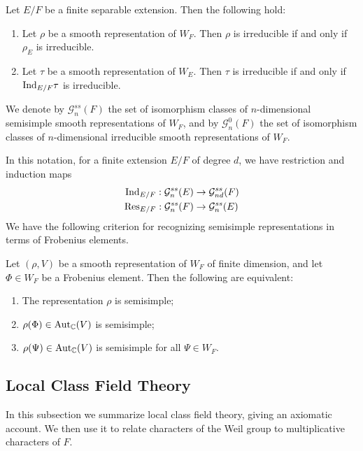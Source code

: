 \begin{lemma}
	Let $E/F$ be a finite separable extension. Then the following hold:
	\begin{enumerate}
		\item Let $\rho$ be a smooth representation of $W_F$. Then $\rho$ is irreducible if and only if $\rho_E$ is irreducible.
		\item Let $\tau$ be a smooth representation of $W_E$. Then $\tau$ is irreducible if and only if $\mathrm{Ind}_{E/F} \tau$ is irreducible.
	\end{enumerate}
\end{lemma}
\begin{notn}
	We denote by $\mathcal{G}^{ss}_n(F)$ the set of isomorphism classes of $n$-dimensional semisimple smooth representations of $W_F$, and by $\mathcal{G}^0_n(F)$ the set of isomorphism classes of $n$-dimensional irreducible smooth representations of $W_F$.
\end{notn}
In this notation, for a finite extension $E/F$ of degree $d$, we have restriction and induction maps
\begin{align*}
	\mathrm{Ind}_{E/F}: \mathcal{G}^{ss}_n(E) &\to \mathcal{G}^{ss}_{nd}(F)\\
	\mathrm{Res}_{E/F}: \mathcal{G}^{ss}_n(F) &\to \mathcal{G}^{ss}_n(E)
\end{align*}
We have the following criterion for recognizing semisimple representations in terms of Frobenius elements.
\begin{prop}
	Let $(\rho, V)$ be a smooth representation of $W_F$ of finite dimension, and let $\Phi\in W_F$ be a Frobenius element. Then the following are equivalent:
	\begin{enumerate}
		\item The representation $\rho$ is semisimple;
		\item $\rho(\Phi)\in \mathrm{Aut}_{\mathbb{C}}(V)$ is semisimple;
		\item $\rho(\Psi)\in \mathrm{Aut}_{\mathbb{C}}(V)$ is semisimple for all $\Psi\in W_F$.
	\end{enumerate}
\end{prop}
\subsection{Local Class Field Theory}
In this subsection we summarize local class field theory, giving an axiomatic account. We then use it to relate characters of the Weil group to multiplicative characters of $F$.

